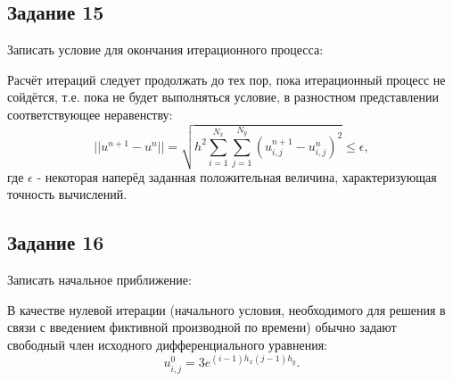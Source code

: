 \documentclass[12pt, a4paper]{report}
\begin{document}
	\subsection*{Задание 15}
	\large
	Записать условие для окончания итерационного процесса: \par
	Расчёт итераций следует продолжать до тех пор, пока итерационный процесс не сойдётся, т.е. пока не будет выполняться условие, в разностном представлении соответствующее неравенству:
	\begin{equation*}
		\lvert \lvert u^{n+1} - u^{n} \rvert \rvert = \sqrt{h^{2}\sum_{i=1}^{N_{x}}\sum_{j=1}^{N_{y}}(u_{i, j}^{n+1} - u_{i, j}^{n})^{2}} \le \epsilon,
	\end{equation*}
	где $\epsilon$ - некоторая наперёд заданная положительная величина, характеризующая точность вычислений.

	\subsection*{Задание 16}
	\large
	Записать начальное приближение: \par
	В качестве нулевой итерации (начального условия, необходимого для решения в связи с введением фиктивной производной по времени) обычно задают свободный член исходного дифференциального уравнения:
	\begin{equation*}
		u_{i, j}^{0} = 3e^{(i-1)h_{x}(j-1)h_{y}}.
	\end{equation*}
\end{document}
